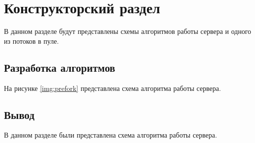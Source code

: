 \chapter{Конструкторский раздел}

В данном разделе будут представлены схемы алгоритмов работы сервера и одного из потоков в пуле.

\section{Разработка алгоритмов}

На рисунке \ref{img:prefork} представлена схема алгоритма работы сервера.


\section*{Вывод}

В данном разделе были представлена схема алгоритма работы сервера.